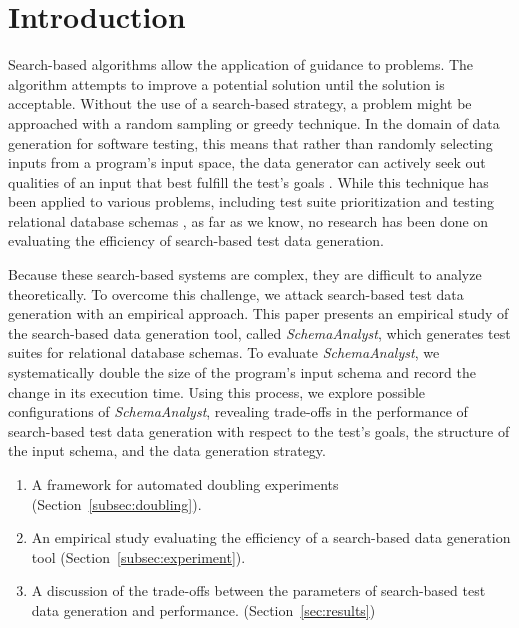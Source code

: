 \section{Introduction}

Search-based algorithms allow the application of guidance to problems.
The algorithm attempts to improve a potential solution until the
solution is acceptable. Without the use of a search-based strategy, a
problem might be approached with a random sampling or greedy
technique. In the
domain of data generation for software testing, this means that rather
than randomly selecting inputs from a program's input space, the data
generator can actively seek out qualities of an input that best fulfill
the test's goals \cite{McMinn2004a}. While this
technique has been applied to various problems, including test suite
prioritization \cite{Walcott:tsp} and testing
relational database schemas \cite{Kapfhammer2013}, 
as far as we know, no research has been done on evaluating the efficiency
of search-based test data generation. 

Because these search-based systems are complex, they are difficult to
analyze theoretically. To overcome this challenge, we attack
search-based test data generation with an empirical approach. This paper presents an empirical study of the search-based data
generation tool, called \textit{SchemaAnalyst}, which generates test suites for
relational database schemas.  To evaluate \textit{SchemaAnalyst}, we systematically double the size of the
program's input schema and record the change in its execution time.
Using this process, we explore possible configurations of
\textit{SchemaAnalyst}, revealing trade-offs in the performance of
search-based test data generation with respect to the test's goals, the
structure of the input schema, and the data generation strategy.

\begin{enumerate}
  \item A framework for automated doubling experiments
    (Section~\ref{subsec:doubling}).
  \item An empirical study evaluating the efficiency of a search-based
    data generation tool (Section~\ref{subsec:experiment}).
  \item A discussion of the trade-offs between the parameters of
    search-based test data generation and performance.  
    (Section~\ref{sec:results})

  \end{enumerate}

